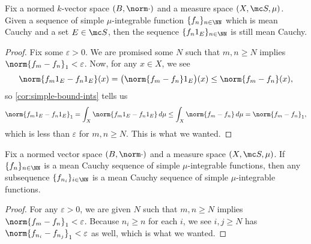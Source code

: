 \documentclass[../notes.tex]{subfiles}
\begin{document}
\begin{lemma} \label{lem:restrict-mean-cauchy}
	Fix a normed $k$-vector space $(B,\norm\cdot)$ and a measure space $(X,\mc S,\mu)$. Given a sequence of simple $\mu$-integrable function $\{f_n\}_{n\in\NN}$ which is mean Cauchy and a set $E\in\mc S$, then the sequence $\{f_n1_E\}_{n\in\NN}$ is still mean Cauchy.
\end{lemma}
\begin{proof}
	Fix some $\varepsilon>0$. We are promised some $N$ such that $m,n\ge N$ implies $\norm{f_m-f_n}_1<\varepsilon$. Now, for any $x\in X$, we see
	\[\norm{f_m1_E-f_n1_E}(x)=\big(\norm{f_m-f_n}1_E\big)(x)\le\norm{f_m-f_n}(x),\]
	so \autoref{cor:simple-bound-ints} tells us
	\[\norm{f_m1_E-f_n1_E}_1=\int_X\norm{f_m1_E-f_n1_E}\,d\mu\le\int_X\norm{f_m-f_n}\,d\mu=\norm{f_m-f_n}_1,\]
	which is less than $\varepsilon$ for $m,n\ge N$. This is what we wanted.
\end{proof}
\begin{lemma} \label{lem:mean-cauchy-subsequence}
	Fix a normed vector space $(B,\norm\cdot)$ and a measure space $(X,\mc S,\mu)$. If $\{f_n\}_{n\in\NN}$ is a mean Cauchy sequence of simple $\mu$-integrable functions, then any subsequence $\{f_{n_i}\}_{i\in\NN}$ is a mean Cauchy sequence of simple $\mu$-integrable functions.
\end{lemma}
\begin{proof}
	For any $\varepsilon>0$, we are given $N$ such that $m,n\ge N$ implies $\norm{f_m-f_n}_1<\varepsilon$. Because $n_i\ge n$ for each $i$, we see $i,j\ge N$ has $\norm{f_{n_i}-f_{n_j}}_1<\varepsilon$ as well, which is what we wanted.
\end{proof}
\end{document}
